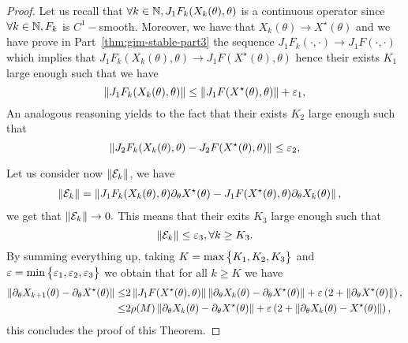 \begin{appendices}
\begin{proof}
Let us recall that $\forall k\in\mathbb{N}, J_1F_k(X_k(\theta),\theta)$ is a continuous operator since $\forall k\in \mathbb{N}, F_k$ is $C^1-$smooth. Moreover, we have that $X_k(\theta)\to X^{\star}(\theta)$ and we have prove in Part~\ref{thm:gim-stable-part3} the sequence $J_1F_k(\cdot,\cdot)\to J_1F(\cdot,\cdot)$ which implies that $J_1F_k(X_k(\theta),\theta)\to J_1F(X^{\star}(\theta),\theta)$ hence their exists $K_1$ large enough such that we have
\[
\left\Vert {J_1F_k(X_k(\theta),\theta)} \right\Vert\leq\left\Vert {J_1F(X^{\star}(\theta),\theta)} \right\Vert+\varepsilon_1,
\]
An analogous reasoning yields to the fact that their exists $K_2$ large enough such that
\[
\left\Vert {J_2F_k(X_k(\theta),\theta)-J_2F(X^{\star}(\theta),\theta)} \right\Vert\leq \varepsilon_2,
\] 


 Let us consider now $\left\Vert {\mathcal{E}_k} \right\Vert$, we have 
\begin{align*}
\left\Vert {\mathcal{E}_k} \right\Vert&=\left\Vert { J_1F_k(X_k(\theta),\theta)\partial_{\theta}X^{\star}(\theta)-J_1F(X^{\star}(\theta),\theta)\partial_{\theta}X_k(\theta)} \right\Vert,
\end{align*}
 we get  that $\left\Vert {\mathcal{E}_k} \right\Vert\to0.$ This means that their exits $K_3$ large enough such that 
 \[
 \left\Vert {\mathcal{E}_k} \right\Vert\leq\varepsilon_3, \forall k\geq K_3. 
 \]
By summing everything up, taking $K=\max\big\{K_1,K_2,K_3\big\}$ and $\varepsilon=\min\big\{\varepsilon_1,\varepsilon_2,\varepsilon_3\big\}$ we obtain that for all $k\geq K$ we have
\begin{align*}
\left\Vert {\partial_{\theta}X_{k+1}(\theta)-\partial_{\theta}X^{\star}(\theta)} \right\Vert\leq&2\left\Vert {J_1F(X^{\star}(\theta),\theta)} \right\Vert\left\Vert {\partial_{\theta}X_k(\theta)-\partial_{\theta}X^{\star}(\theta)} \right\Vert+\varepsilon\left({2+\left\Vert {\partial_{\theta}X^{\star}(\theta)} \right\Vert}\right),\\
\leq&2\rho(M)\left\Vert {\partial_{\theta}X_k(\theta)-\partial_{\theta}X^{\star}(\theta)} \right\Vert+\varepsilon\left({2+\left\Vert {\partial_{\theta}X_k(\theta)-X^{\star}(\theta)} \right\Vert}\right),
\end{align*}
this concludes the  proof of this Theorem. 

\end{proof}













	\end{appendices}
